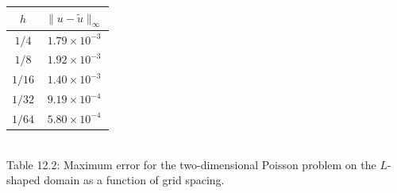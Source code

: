 
\begin{center}
    \begin{tabular}{cc}
        $h$ & $\|u - \tilde{u}\|_\infty$ \\
        \hline
        $1/4$ & $1.79 \times 10^{-3}$ \\
        $1/8$ & $1.92 \times 10^{-3}$ \\
        $1/16$ & $1.40 \times 10^{-3}$ \\
        $1/32$ & $9.19 \times 10^{-4}$ \\
        $1/64$ & $5.80 \times 10^{-4}$
    \end{tabular}\\[4pt]
    {\small Table 12.2: Maximum error for the two-dimensional Poisson problem on the $L$-shaped domain as a function of grid spacing.}
\end{center}

